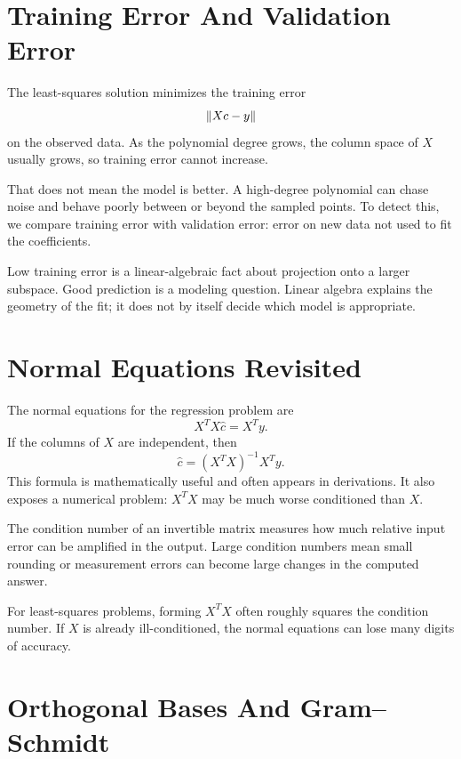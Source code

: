 \section{Training Error And Validation Error}

The least-squares solution minimizes the training error
\[
  \left\lVert Xc-y \right\rVert
\]
on the observed data. As the polynomial degree grows, the column space of $X$
usually grows, so training error cannot increase.

That does not mean the model is better. A high-degree polynomial can chase
noise and behave poorly between or beyond the sampled points. To detect this,
we compare training error with validation error: error on new data not used to
fit the coefficients.

\begin{warningbox}
Low training error is a linear-algebraic fact about projection onto a larger
subspace. Good prediction is a modeling question. Linear algebra explains the
geometry of the fit; it does not by itself decide which model is appropriate.
\end{warningbox}

\section{Normal Equations Revisited}

The normal equations for the regression problem are
\[
  X^TX\hat{c}=X^Ty.
\]
If the columns of $X$ are independent, then
\[
  \hat{c}=(X^TX)^{-1}X^Ty.
\]
This formula is mathematically useful and often appears in derivations. It
also exposes a numerical problem: $X^TX$ may be much worse conditioned than
$X$.

\begin{definition}
The condition number of an invertible matrix measures how much relative input
error can be amplified in the output. Large condition numbers mean small
rounding or measurement errors can become large changes in the computed
answer.
\end{definition}

For least-squares problems, forming $X^TX$ often roughly squares the condition
number. If $X$ is already ill-conditioned, the normal equations can lose many
digits of accuracy.

\section{Orthogonal Bases And Gram--Schmidt}

